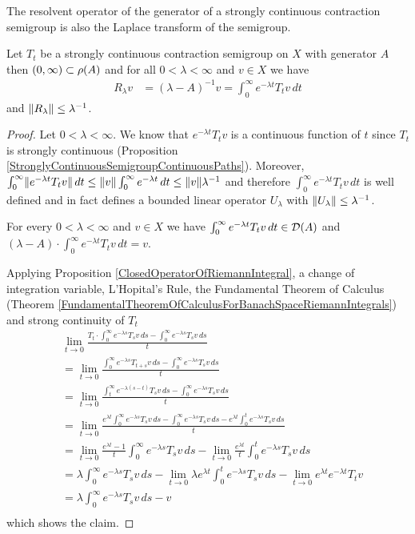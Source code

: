 The resolvent operator of the generator of a strongly continuous contraction semigroup is also the Laplace transform of the semigroup.
\begin{prop}\label{SCCSResolventAsLaplaceTransform}Let $T_t$ be a strongly continuous contraction semigroup on $X$ with generator $A$ then $(0,\infty) \subset \rho(A)$ and 
for all $0 < \lambda < \infty$ and $v \in X$ we have
\begin{align*}
R_\lambda v &= (\lambda - A)^{-1}v = \int_0^\infty e^{-\lambda t} T_tv \, dt
\end{align*}
and $\lVert R_\lambda \rVert \leq \lambda^{-1}$. 
\end{prop}
\begin{proof}
Let $0 < \lambda < \infty$.  We know that $e^{-\lambda t} T_t v$ is a continuous function of $t$ since $T_t$ is strongly continuous (Proposition \ref{StronglyContinuousSemigroupContinuousPaths}).  Moreover,
$\int_0^\infty \lVert e^{-\lambda t} T_t v \rVert \, dt \leq \lVert v \rVert \int_0^\infty e^{-\lambda t} \, dt \leq \lVert v \rVert \lambda^{-1}$ and therefore $\int_0^\infty e^{-\lambda t} T_tv \, dt$ is well defined
and in fact defines a bounded linear operator $U_\lambda$ with $\lVert U_\lambda \rVert \leq \lambda^{-1}$. 

\begin{clm}For every $0 < \lambda < \infty$ and $v \in X$ we have $\int_0^\infty e^{-\lambda t} T_t v \, dt \in \mathcal{D}(A)$ and $(\lambda - A) \cdot \int_0^\infty e^{-\lambda t} T_t v \, dt = v$.
\end{clm}
Applying Proposition \ref{ClosedOperatorOfRiemannIntegral}, a change of integration variable, L'Hopital's Rule, the Fundamental Theorem of Calculus (Theorem \ref{FundamentalTheoremOfCalculusForBanachSpaceRiemannIntegrals}) and strong continuity of $T_t$
\begin{align*}
&\lim_{t \to 0} \frac{T_t \cdot \int_0^\infty e^{-\lambda s} T_s v \, ds - \int_0^\infty e^{-\lambda s} T_s v \, ds}{t} \\
&=\lim_{t \to 0} \frac{\int_0^\infty e^{-\lambda s} T_{t+s} v \, ds - \int_0^\infty e^{-\lambda s} T_s v \, ds}{t} \\
&=\lim_{t \to 0} \frac{\int_t^\infty e^{-\lambda (s-t)} T_{s} v \, ds - \int_0^\infty e^{-\lambda s} T_s v \, ds}{t} \\
&=\lim_{t \to 0} \frac{e^{\lambda t} \int_0^\infty e^{-\lambda s} T_{s} v \, ds - \int_0^\infty e^{-\lambda s} T_s v \, ds - e^{\lambda t} \int_0^t e^{-\lambda s} T_{s} v \, ds}{t} \\
&=\lim_{t \to 0} \frac{e^{\lambda t} - 1}{t} \int_0^\infty e^{-\lambda s} T_{s} v \, ds - \lim_{t \to 0} \frac{e^{\lambda t}}{t} \int_0^t e^{-\lambda s} T_{s} v \, ds\\
&= \lambda \int_0^\infty e^{-\lambda s} T_{s} v \, ds - \lim_{t \to 0} \lambda e^{\lambda t} \int_0^t e^{-\lambda s} T_{s} v \, ds - \lim_{t \to 0} e^{\lambda t}  e^{-\lambda t} T_{t} v\\
&= \lambda \int_0^\infty e^{-\lambda s} T_{s} v \, ds - v\\
\end{align*}
which shows the claim.


\end{proof}
